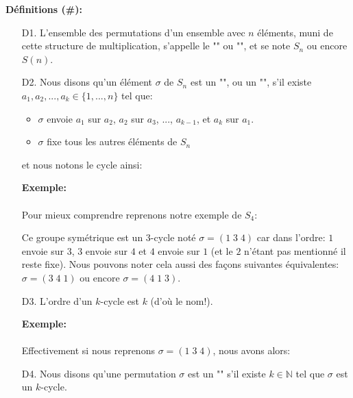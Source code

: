 	 \textbf{Définitions (\#\mydef):}
	 \begin{enumerate}
		\item[D1.] L'ensemble des permutations d'un ensemble avec $n$ éléments, muni de cette structure de multiplication, s'appelle le "" ou  "", et se note $S_n$ ou encore $S(n)$.
		
		\item[D2.] Nous disons qu'un élément $\sigma$ de $S_n$ est un "", ou un "", s'il existe $a_1,a_2,...,a_k\in \{1,...,n\}$ tel que:
		\begin{itemize}
			\item $\sigma$ envoie $a_1$ sur $a_2$, $a_2$ sur $a_3$, ..., $a_{k-1}$, et $a_k$ sur $a_1$.

			\item $\sigma$ fixe tous les autres éléments de $S_n$
		\end{itemize}
		et nous notons le cycle ainsi:
		
		\begin{tcolorbox}[colframe=black,colback=white,sharp corners]
		\textbf{{\Large {}}Exemple:}\\\\
		Pour mieux comprendre reprenons notre exemple de $S_4$:
		
		Ce groupe symétrique est un $3$-cycle noté $\sigma=(1\; 3\; 4)$ car dans l'ordre: $1$ envoie sur $3$, $3$ envoie sur $4$ et $4$ envoie sur $1$ (et le $2$ n'étant pas mentionné il reste fixe). Nous pouvons noter cela aussi des façons suivantes équivalentes: $\sigma=(3\; 4\; 1)$ ou encore $\sigma=(4\; 1\; 3)$.
		\end{tcolorbox}

		\item[D3.] L'ordre d'un $k$-cycle est $k$ (d'où le nom!).
		\begin{tcolorbox}[colframe=black,colback=white,sharp corners]
		\textbf{{\Large {}}Exemple:}\\\\
		Effectivement si nous reprenons $\sigma=(1\; 3\; 4)$, nous avons alors:
		
		\end{tcolorbox}

		\item[D4.] Nous disons qu'une permutation $\sigma$ est un "" s'il existe $k\in \mathbb{N}$ tel que $\sigma$ est un $k$-cycle.
		

\end{enumerate}

